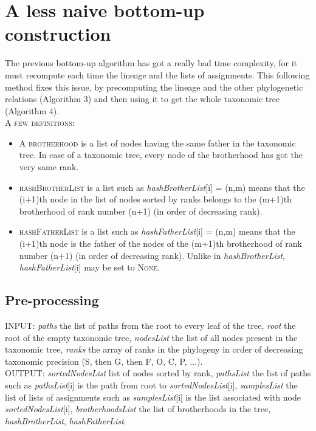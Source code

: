 \documentclass{report}
\begin{document}
\section{A less naive bottom-up construction}

The previous bottom-up algorithm has got a really bad time complexity, for it must recompute each time the lineage and the lists of assignments. This following method fixes this issue, by precomputing the lineage and the other phylogenetic relations (Algorithm 3) and then using it to get the whole taxonomic tree (Algorithm 4). \\

\textsc{A few definitions:}
\begin{itemize}
\item A \textsc{brotherhood} is a list of nodes having the same father in the taxonomic tree. In case of a taxonomic tree, every node of the brotherhood has got the very same rank.
\item \textsc{hashBrotherList} is a list such as \emph{hashBrotherList}[i] = (n,m) means that the (i+1)th node in the list of nodes sorted by ranks belongs to the (m+1)th brotherhood of rank number (n+1) (in order of decreasing rank).
\item \textsc{hashFatherList} is a list such as \emph{hashFatherList}[i] = (n,m) means that the (i+1)th node is the father of the nodes of the (m+1)th brotherhood of rank number (n+1) (in order of decreasing rank). Unlike in \emph{hashBrotherList}, \emph{hashFatherList}[i] may be set to \textsc{None}. 
\end{itemize}

\subsection{Pre-processing}

\textsc{INPUT:} \emph{paths} the list of paths from the root to every leaf of the tree, \emph{root} the root of the empty taxonomic tree, \emph{nodesList} the list of all nodes present in the taxonomic tree, \emph{ranks} the array of ranks in the phylogeny in order of decreasing taxonomic precision (S, then G, then F, O, C, P, ...).\\

\textsc{OUTPUT:} \emph{sortedNodesList} list of nodes sorted by rank, \emph{pathsList} the list of paths such as \emph{pathsList}[i] is the path from root to \emph{sortedNodesList}[i], \emph{samplesList} the list of lists of assignments such as \emph{samplesList}[i] is the list associated with node \emph{sortedNodesList}[i], \emph{brotherhoodsList} the list of brotherhoods in the tree, \emph{hashBrotherList}, \emph{hashFatherList}.\\
\end{document}
